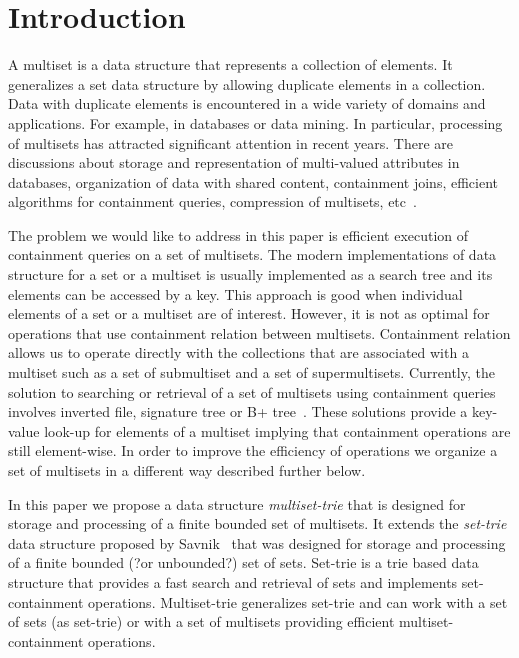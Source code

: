 \section{Introduction} \label{c:introduction}
%
%
A multiset is a data structure that represents a collection of elements. It generalizes a set data structure 
by allowing duplicate elements in a collection. 
%
Data with duplicate elements is encountered in a wide variety of domains and applications. For example, 
in databases or data mining. In particular, processing of multisets has attracted significant attention in 
recent years. 
%
There are discussions about storage and representation of multi-valued attributes in databases, organization 
of data with shared content, containment joins, efficient algorithms for containment queries, compression 
of multisets, etc~\cite{bouros2016set,gripon2012compressing,ross2004symmetric,steinruecken2015compressing}.

%
%
The problem we would like to address in this paper is efficient execution of containment queries on a set of multisets.
The modern implementations of data structure for a set or a multiset is usually implemented as a search tree and 
its elements can be accessed by a key. 
%
This approach is good when individual elements of a set or a multiset are of interest. However, it is not as optimal for operations 
that use containment relation between multisets. 
%
Containment relation allows us to operate directly with the collections that are associated with a multiset such as a set 
of submultiset and a set of supermultisets.
%
Currently, the solution to searching or retrieval of a set of multisets using containment queries involves inverted file, 
signature tree or B+ tree~\cite{Helmer2003}. These solutions provide a key-value look-up for elements of a multiset implying that 
containment operations are still element-wise. In order to improve the efficiency of operations we organize a set of 
multisets in a different way described further below.


%
In this paper we propose a data structure \emph{multiset-trie} that is designed for storage and 
processing of a finite bounded set of multisets. It extends the \emph{set-trie} data structure proposed 
by Savnik~\cite{savnik2013index} that was designed for storage and processing of a finite bounded (?or 
unbounded?) set of sets. 
%
Set-trie is a trie based data structure that provides a fast search and retrieval of sets and implements 
set-containment operations. 
%
Multiset-trie generalizes set-trie and can work with a set of sets (as set-trie) or with 
a set of multisets providing efficient multiset-containment operations.

